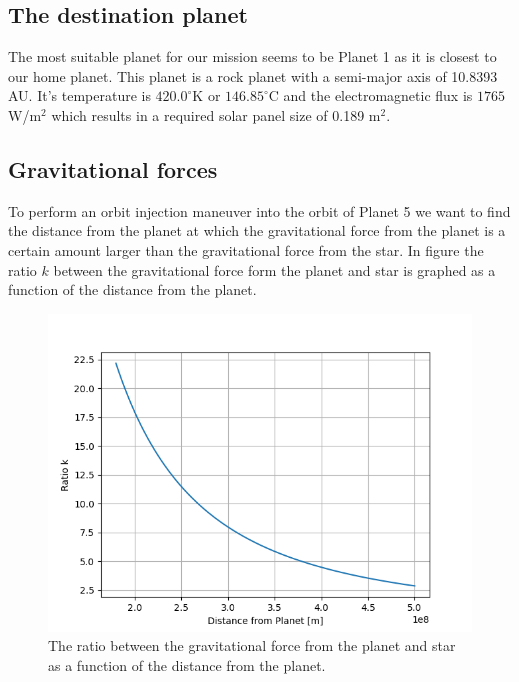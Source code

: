 \documentclass[reprint,english,notitlepage]{revtex4-2}
\begin{document}
\subsection{The destination planet}\label{subsec:the-destination-planet}
	The most suitable planet for our mission seems to be Planet 1 as it is closest to our home planet.
	This planet is a rock planet with a semi-major axis of 10.8393 AU.
	It's temperature is $420.0^{\circ}$K or $146.85^{\circ}$C and the electromagnetic flux is $1765$ W/m$^2$ which results in a required solar panel size of 0.189 m$^2$.\\


\subsection{Gravitational forces}\label{subsec:gravitational-forces}
	To perform an orbit injection maneuver into the orbit of Planet 5 we want to find the distance from the planet at which the gravitational force from the planet is a certain amount larger than the gravitational force from the star.
	In figure the ratio $k$ between the gravitational force form the planet and star is graphed as a function of the distance from the planet.

	\begin{figure}[h]
		\centering
		\includegraphics[scale=0.4]{Figures/Grav_ratio_k}
		\caption{The ratio between the gravitational force from the planet and star as a function of the distance from the planet.}\label{fig:k_ratio_dist}
	\end{figure}
\end{document}
